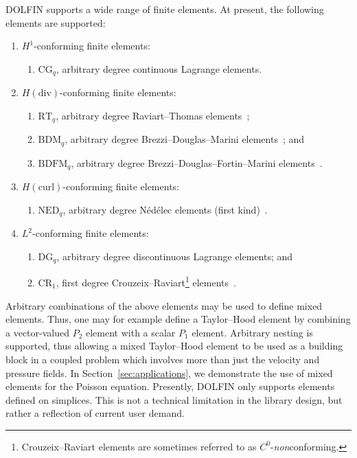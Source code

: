 \documentclass[acmtoms]{acmtrans2m}
\newcommand{\dolfin}{DOLFIN}
\begin{document}
\dolfin{} supports a wide range of finite elements.  At present, the
following elements are supported:
\begin{enumerate}
\item
  $H^1$-conforming finite elements:
  \begin{enumerate}
  \item
    $\mathrm{CG}_q$, arbitrary degree continuous Lagrange elements.
  \end{enumerate}
\item
  $H(\mathrm{div})$-conforming finite elements:
  \begin{enumerate}
  \item
    $\mathrm{RT}_q$, arbitrary degree Raviart--Thomas elements~\cite{RavTho77b};
  \item
    $\mathrm{BDM}_q$, arbitrary degree Brezzi--Douglas--Marini elements~\cite{BreDou85}; and
  \item
    $\mathrm{BDFM}_q$, arbitrary degree
    Brezzi--Douglas--Fortin--Marini elements~\cite{BreDou87}.
  \end{enumerate}
\item
  $H(\mathrm{curl})$-conforming finite elements:
  \begin{enumerate}
  \item
    $\mathrm{NED}_q$, arbitrary degree N\'ed\'elec elements (first
    kind)~\cite{Ned80}.
  \end{enumerate}
\item
  $L^2$-conforming finite elements:
  \begin{enumerate}
  \item
    $\mathrm{DG}_q$, arbitrary degree discontinuous Lagrange elements; and
  \item
    $\mathrm{CR}_1$, first degree Crouzeix--Raviart\footnote{Crouzeix--Raviart elements are sometimes referred to as $C^0$-\emph{non}conforming.} elements~\cite{CroRav73}.
  \end{enumerate}
\end{enumerate}
Arbitrary combinations of the above elements may be used to define
mixed elements. Thus, one may for example define a Taylor--Hood
element by combining a vector-valued $P_2$ element with a
scalar $P_1$ element. Arbitrary nesting is supported, thus
allowing a mixed Taylor--Hood element to be used as a building block
in a coupled problem which involves more than just the
velocity and pressure fields.
In Section~\ref{sec:applications},
we demonstrate the use of mixed elements for the
Poisson equation. Presently, \dolfin{} only supports elements defined
on simplices. This is not a technical limitation in the library
design, but rather a reflection of current user demand.
\end{document}
